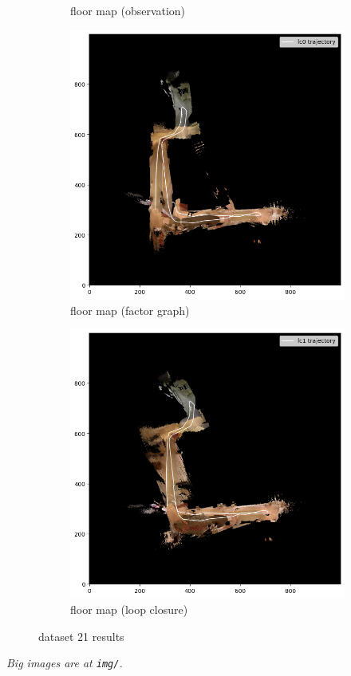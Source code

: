 \documentclass[conference]{IEEEtran}
\begin{document}
\begin{figure}
\begin{subfigure}{0.24\textwidth}
        \caption{floor map (observation)}
        \label{fig:fmap_21_icp}
    \end{subfigure}
    \hfill
    \begin{subfigure}{0.24\textwidth}
        \includegraphics[width=\linewidth]{../img/fmap_21_lc0.png}
        \caption{floor map (factor graph)}
        \label{fig:fmap_21_lc0}
    \end{subfigure}
    \hfill
    \begin{subfigure}{0.24\textwidth}
        \includegraphics[width=\linewidth]{../img/fmap_21_lc1.png}
        \caption{floor map (loop closure)}
        \label{fig:fmap_21_lc1}
    \end{subfigure}
    
    \caption{dataset 21 results}
    \label{fig:dataset21}
\end{figure}
\textit{Big images are at \texttt{img/}.}
\end{document}
